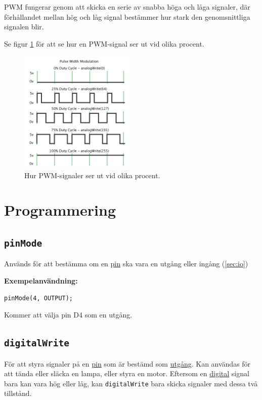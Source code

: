 \documentclass[11pt]{article}
\begin{document}
PWM fungerar genom att skicka en serie av snabba höga och låga signaler, där
förhållandet mellan hög och låg signal bestämmer hur stark den genomsnittliga
signalen blir. 

Se figur \ref{fig:pwm} för att se hur en PWM-signal ser ut vid olika procent.

\begin{figure}[H]
      \centering
      \includegraphics[width=0.5\textwidth]{pwm}
      \caption{Hur PWM-signaler ser ut vid olika procent.}
      \label{fig:pwm}
\end{figure}

\section{Programmering}
\subsection{\texttt{pinMode}}\label{sec:pinmode}
Används för att bestämma om en \hyperref[sec:pin]{pin} ska vara en utgång eller
ingång (\ref{sec:io})

\textbf{Exempelanvändning:}
\begin{lstlisting}
pinMode(4, OUTPUT);
\end{lstlisting}
Kommer att välja pin D4 som en utgång.

\subsection{\texttt{digitalWrite}}
För att styra signaler på en \hyperref[sec:pin]{pin} som är bestämd som
\hyperref[sec:io]{utgång}. Kan användas för att tända eller släcka en lampa,
eller styra en motor. Eftersom en \hyperref[sec:analog-digital]{digital} signal
bara kan vara hög eller låg, kan \texttt{digitalWrite} bara skicka signaler med
dessa två tillstånd.
\end{document}
